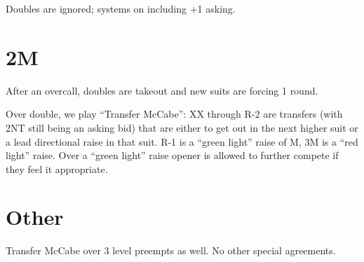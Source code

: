\documentclass[tom-ari]{subfile}
\begin{document}
	Doubles are ignored; systems on including +1 asking.
	
	\section{2M}
	
	After an overcall, doubles are takeout and new suits are forcing 1 round.
	
	Over double, we play ``Transfer McCabe'': XX through R-2 are transfers (with 2NT still being an asking bid) that are either to get out in the next higher suit or a lead directional raise in that suit. R-1 is a ``green light'' raise of M, 3M is a ``red light'' raise. Over a ``green light'' raise opener is allowed to further compete if they feel it appropriate.
	
	\section{Other}
	
	Transfer McCabe over 3 level preempts as well. No other special agreements.
	
\end{document}
